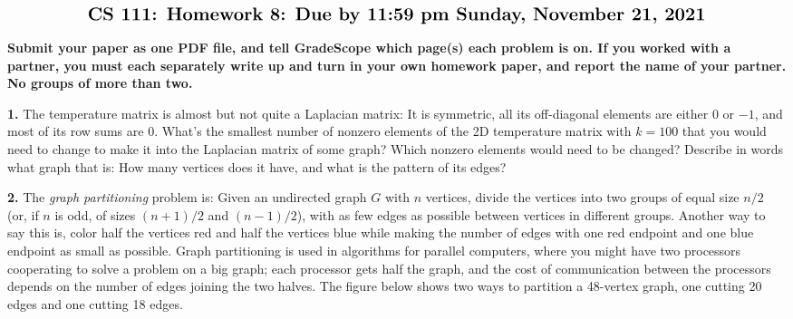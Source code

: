 \documentclass[11pt]{article}
\begin{document}
$$\mbox{\Large \bf CS 111: Homework 8: Due by 11:59 pm Sunday, November 21, 2021}$$
\par\smallskip\noindent
{\bf Submit your paper as one PDF file,
and tell GradeScope which page(s) each problem is on.
If you worked with a partner, 
you must each separately write up and turn in your own homework paper, 
and report the name of your partner.
No groups of more than two.
}

\par\bigskip
{\bf 1.}
The temperature matrix is almost but not quite a Laplacian matrix:
It is symmetric, all its off-diagonal elements are either $0$ or $-1$,
and most of its row sums are $0$.
What's the smallest number of nonzero elements of the
2D temperature matrix with $k=100$ that you would need to change to make 
it into the Laplacian matrix of some graph? 
Which nonzero elements would need to be changed?
Describe in words what graph that is:
How many vertices does it have, and what is the pattern of its edges?

\par\bigskip
{\bf 2.}
The {\em graph partitioning} problem is:
Given an undirected graph $G$ with $n$ vertices, 
divide the vertices into two groups of equal size $n/2$ 
(or, if $n$ is odd, of sizes $(n+1)/2$ and $(n-1)/2$),
with as few edges as possible between vertices in different groups.
Another way to say this is,
color half the vertices red and half the vertices blue while making
the number of edges with one red endpoint and one blue endpoint as small as possible.
Graph partitioning is used in algorithms for parallel computers, 
where you might have two processors cooperating to solve a problem on a big graph;
each processor gets half the graph, 
and the cost of communication between the processors depends on the number
of edges joining the two halves.
The figure below shows two ways to partition a 48-vertex graph,
one cutting 20 edges and one cutting 18 edges.
\end{document}
